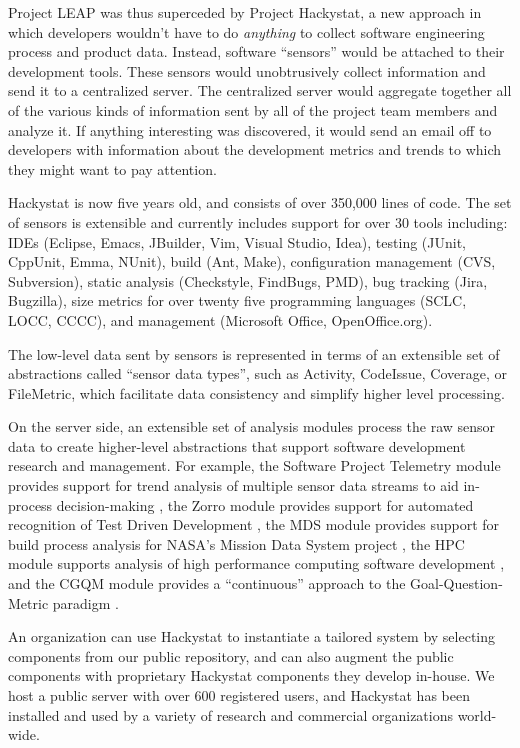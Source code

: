 \documentclass[10pt,twocolumn]{article}
\begin{document}
Project LEAP was thus superceded by Project Hackystat\cite{Hackystat}, a new approach in
which developers wouldn't have to do {\em anything} to collect software
engineering process and product data.  Instead, software ``sensors'' would
be attached to their development tools.  These sensors would unobtrusively
collect information and send it to a centralized server.  The centralized
server would aggregate together all of the various kinds of information
sent by all of the project team members and analyze it. If anything
interesting was discovered, it would send an email off to developers with
information about the development metrics and trends to which they might
want to pay attention.

Hackystat is now five years old, and consists of over 350,000 lines of
code.  The set of sensors is extensible and currently includes support for
over 30 tools including: IDEs (Eclipse, Emacs, JBuilder, Vim, Visual Studio, Idea), testing (JUnit,
CppUnit, Emma, NUnit), build (Ant, Make), configuration management (CVS,
Subversion), static analysis (Checkstyle, FindBugs, PMD), bug tracking
(Jira, Bugzilla), size metrics for over twenty five programming languages
(SCLC, LOCC, CCCC), and management (Microsoft Office, OpenOffice.org). 

The low-level data sent by sensors is represented in terms of an extensible
set of abstractions called ``sensor data types'', such as Activity,
CodeIssue, Coverage, or FileMetric, which facilitate data consistency and
simplify higher level processing.  

On the server side, an extensible set of analysis modules process the raw
sensor data to create higher-level abstractions that support software
development research and management. For example, the Software Project
Telemetry module provides support for trend analysis of multiple sensor
data streams to aid in-process decision-making \cite{csdl2-04-11}, the
Zorro module provides support for automated recognition of Test Driven
Development \cite{csdl2-06-02}, the MDS module provides support for build
process analysis for NASA's Mission Data System project \cite{csdl2-03-07},
the HPC module supports analysis of high performance computing software
development \cite{csdl2-04-22}, and the CGQM module provides a ``continuous''
approach to the Goal-Question-Metric paradigm \cite{csdl2-05-09}.

An organization can use Hackystat to instantiate a tailored system by
selecting components from our public repository, and can also augment the
public components with proprietary Hackystat components they develop
in-house.  We host a public server with over 600 registered users, and
Hackystat has been installed and used by a variety of research and
commercial organizations world-wide.
\end{document}
